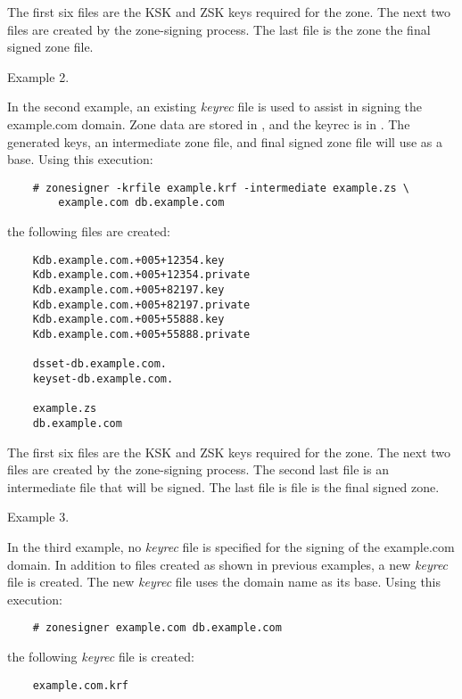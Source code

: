 The first six files are the KSK and ZSK keys required for the zone.  The next
two files are created by the zone-signing process.  The last file is the zone
the final signed zone file.

Example 2.

In the second example, an existing {\it keyrec} file is used to assist in
signing the example.com domain.  Zone data are stored in ,
and the keyrec is in .  The generated keys, an intermediate
zone file, and final signed zone file will use  as a base.
Using this execution:

\begin{verbatim}
    # zonesigner -krfile example.krf -intermediate example.zs \
	    example.com db.example.com
\end{verbatim}

the following files are created:

\begin{verbatim}
    Kdb.example.com.+005+12354.key
    Kdb.example.com.+005+12354.private
    Kdb.example.com.+005+82197.key
    Kdb.example.com.+005+82197.private
    Kdb.example.com.+005+55888.key
    Kdb.example.com.+005+55888.private

    dsset-db.example.com.
    keyset-db.example.com.

    example.zs
    db.example.com
\end{verbatim}

The first six files are the KSK and ZSK keys required for the zone.  The next
two files are created by the zone-signing process.  The second last file is
an intermediate file that will be signed.  The last file is file is the final
signed zone.

Example 3.

In the third example, no {\it keyrec} file is specified for the signing of the
example.com domain.  In addition to files created as shown in previous
examples, a new {\it keyrec} file is created.  The new {\it keyrec} file uses
the domain name as its base.  Using this execution:

\begin{verbatim}
    # zonesigner example.com db.example.com
\end{verbatim}

the following {\it keyrec} file is created:

\begin{verbatim}
    example.com.krf
\end{verbatim}

